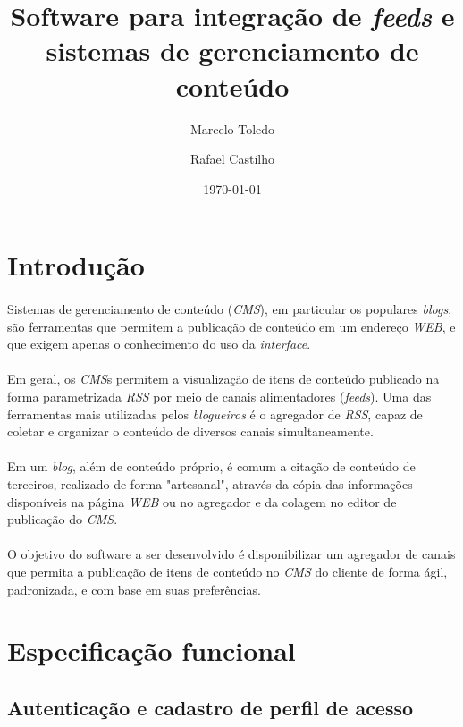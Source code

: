 \documentclass[a4paper,12pt]{article}
\def\cms{\emph{CMS}}
\def\rss{\emph{RSS}}
\begin{document}
\title{Software para integração de \emph{feeds} e sistemas de gerenciamento de conteúdo}
\author{Marcelo Toledo \and Rafael Castilho}
\date{\today}
\maketitle

\newpage
\section{Introdução}

\paragraph{}
Sistemas de gerenciamento de conteúdo (\cms{}), em particular os populares \emph{blogs}, são ferramentas que permitem a publicação de conteúdo em um endereço \emph{WEB}, e que exigem apenas o conhecimento do uso da \emph{interface}.
\paragraph{}
Em geral, os \cms{}s permitem a visualização de itens de conteúdo publicado na forma parametrizada \rss{} por meio de canais alimentadores (\emph{feeds}). Uma das ferramentas mais utilizadas pelos \emph{blogueiros} é o agregador de \rss{}, capaz de coletar e organizar o conteúdo de diversos canais simultaneamente.
\paragraph{}
Em um \emph{blog}, além de conteúdo próprio, é comum a citação de conteúdo de terceiros, realizado de forma "artesanal", através da cópia das informações disponíveis na página \emph{WEB} ou no agregador e da colagem no editor de publicação do \cms{}.
\paragraph{}
O objetivo do software a ser desenvolvido é disponibilizar um agregador de canais que permita a publicação de itens de conteúdo no \cms{} do cliente de forma ágil, padronizada, e com base em suas preferências.

\section{Especificação funcional}

\subsection{Autenticação e cadastro de perfil de acesso}
\end{document}
